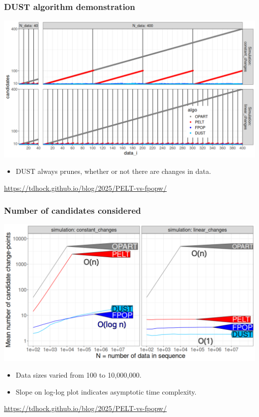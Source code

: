 \documentclass{beamer}
\begin{document}
\begin{frame}
  \frametitle{DUST algorithm demonstration}
  \includegraphics[width=\textwidth]{dust-prune-1.png}

  \begin{itemize}
  \item DUST always prunes, whether or not there are changes in data.
  \end{itemize}

  \url{https://tdhock.github.io/blog/2025/PELT-vs-fpopw/}
\end{frame}

\begin{frame}
  \frametitle{Number of candidates considered}
  \includegraphics[width=\textwidth]{figure-pred-candidates-O.png}

  \begin{itemize}
  \item Data sizes varied from 100 to 10,000,000.
  \item Slope on log-log plot indicates asymptotic time complexity.
  \end{itemize}

  \url{https://tdhock.github.io/blog/2025/PELT-vs-fpopw/}
\end{frame}
\end{document}
